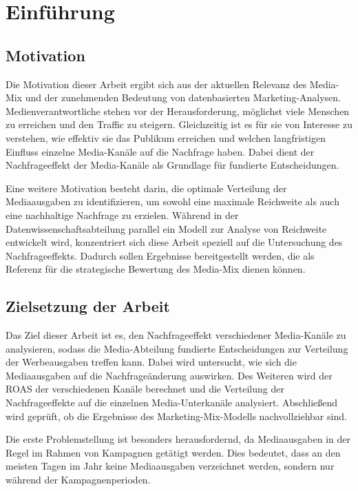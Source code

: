 \newpage
\section{Einführung}
\label{Einführung}
\subsection{Motivation}
Die Motivation dieser Arbeit ergibt sich aus der aktuellen Relevanz des Media-Mix und der zunehmenden Bedeutung von datenbasierten Marketing-Analysen. Medienverantwortliche stehen vor der Herausforderung, möglichst viele Menschen zu erreichen und den Traffic zu steigern. Gleichzeitig ist es für sie von Interesse zu verstehen, wie effektiv sie das Publikum erreichen und welchen langfristigen Einfluss einzelne Media-Kanäle auf die Nachfrage haben. Dabei dient der Nachfrageeffekt der Media-Kanäle als Grundlage für fundierte Entscheidungen.\par
Eine weitere Motivation besteht darin, die optimale Verteilung der Mediaausgaben zu identifizieren, um sowohl eine maximale Reichweite als auch eine nachhaltige Nachfrage zu erzielen. Während in der Datenwissenschaftsabteilung parallel ein Modell zur Analyse von Reichweite entwickelt wird, konzentriert sich diese Arbeit speziell auf die Untersuchung des Nachfrageeffekts. Dadurch sollen Ergebnisse bereitgestellt werden, die als Referenz für die strategische Bewertung des Media-Mix dienen können. 
\subsection{Zielsetzung der Arbeit}
\label{ZielsetzungDerArbeit}
Das Ziel dieser Arbeit ist es, den Nachfrageeffekt verschiedener Media-Kanäle zu analysieren, sodass die Media-Abteilung fundierte Entscheidungen zur Verteilung der Werbeausgaben treffen kann. Dabei wird untersucht, wie sich die Mediaausgaben auf die Nachfrageänderung auswirken. Des Weiteren wird der \ac{ROAS} der verschiedenen Kanäle berechnet und die Verteilung der Nachfrageeffekte auf die einzelnen Media-Unterkanäle analysiert. Abschließend wird geprüft, ob die Ergebnisse des Marketing-Mix-Modells nachvollziehbar sind.\par
Die erste Problemstellung ist besonders herausfordernd, da Mediaausgaben in der Regel im Rahmen von Kampagnen getätigt werden. Dies bedeutet, dass an den meisten Tagen im Jahr keine Mediaausgaben verzeichnet werden, sondern nur während der Kampagnenperioden. 
